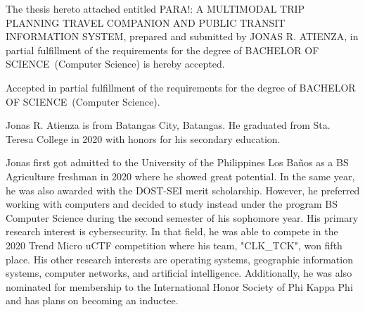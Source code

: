 \documentclass{icsthesis}
\renewcommand{\TITLE}{PARA!: A MULTIMODAL TRIP PLANNING TRAVEL COMPANION AND PUBLIC TRANSIT INFORMATION SYSTEM}
\renewcommand{\AUTHOR}{JONAS R. ATIENZA}
\renewcommand{\DEGREE}{BACHELOR OF SCIENCE}
\renewcommand{\MAJOR}{Computer Science}
\begin{document}
	
	\begin{frontmatter}
		\maketitle
				
		\begin{approvalpage}
			The thesis hereto attached entitled \TITLE , prepared and submitted by \AUTHOR , in partial fulfillment of the requirements for the degree of \DEGREE\ (\MAJOR) is hereby accepted.
			
			\begin{multicols}{2}
				\centering
				\columnbreak
			\end{multicols}
			
			Accepted in partial fulfillment of the requirements for the degree of \DEGREE\ (\MAJOR). 
		\end{approvalpage}
		
		\begin{biosketch}
            Jonas R. Atienza is from Batangas City, Batangas.
            He graduated from Sta. Teresa College in 2020 with honors for his secondary education.

            Jonas first got admitted to the University of the Philippines Los Baños as a BS Agriculture freshman  in 2020 where he showed great potential.
            In the same year, he was also awarded with the DOST-SEI merit scholarship.
            However, he preferred working with computers and decided to study instead under the program BS Computer Science during the second semester of his sophomore year.
            His primary research interest is cybersecurity. In that field, he was able to compete in the 2020 Trend Micro uCTF competition where his team, "CLK\_TCK", won fifth place.
            His other research interests are operating systems, geographic information systems, computer networks, and artificial intelligence. Additionally, he was also nominated for membership to the International Honor Society of Phi Kappa Phi and has plans on becoming an inductee.


\end{biosketch}
\end{frontmatter}
\end{document}
